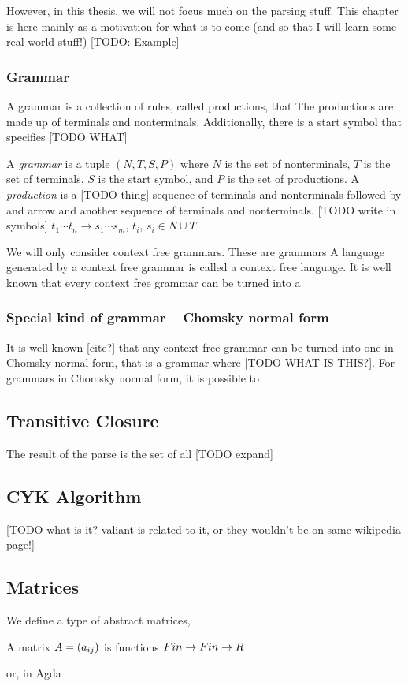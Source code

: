 \documentclass{article}
\begin{document}
However, in this thesis, we will not focus much on the parsing stuff. This chapter is here mainly as a motivation for what is to come (and so that I will learn some real world stuff!)
[TODO: Example]
\subsubsection{Grammar}
A grammar is a collection of rules, called productions, that 
The productions are made up of terminals and nonterminals.
Additionally, there is a start symbol that specifies [TODO WHAT]
\begin{Def}
  A \emph{grammar} is a tuple $(N, T, S, P)$ where $N$ is the set of nonterminals, $T$ is the set of terminals, $S$ is the start symbol, and $P$ is the set of productions. A \emph{production} is a [TODO thing] sequence of terminals and nonterminals followed by and arrow and another sequence of terminals and nonterminals. [TODO write in symbols] $t_1 \dotsb t_n \to s_1 \dotsb s_m$, $t_i$, $s_i \in N \cup T$
\end{Def}
We will only consider context free grammars. These are grammars 
A language generated by a context free grammar is called a context free language. It is well known that every context free grammar can be turned into a 
\subsubsection{Special kind of grammar -- Chomsky normal form}
It is well known [cite?] that any context free grammar can be turned into one in Chomsky normal form, that is a grammar where [TODO WHAT IS THIS?]. For grammars in Chomsky normal form, it is possible to
\subsection{Transitive Closure}
The result of the parse is the set of all [TODO expand]
\subsection{CYK Algorithm}
[TODO what is it? valiant is related to it, or they wouldn't be on same wikipedia page!]

\subsection{Matrices}
We define a type of abstract matrices, 
\begin{Def}
A matrix $A = (a_{ij})$ is functions $Fin \to Fin \to R$
\end{Def}
or, in Agda
\end{document}
